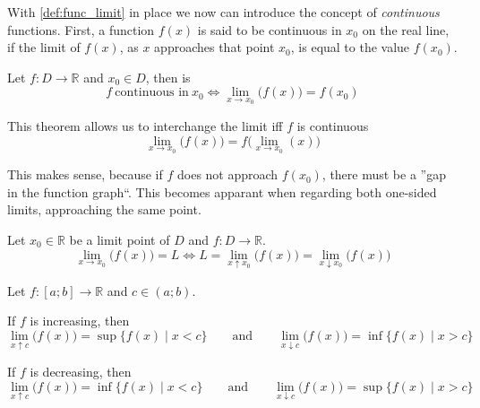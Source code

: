 With \cref{def:func_limit} in place we now can introduce the concept of \emph{continuous} functions.
First, a function \(f(x)\) is said to be continuous in \(x_0\) on the real line, if the limit of \(f(x)\), as \(x\) approaches that point \(x_0\), is equal to the value \(f(x_0)\).
\begin{theorem}
   Let \(f: D \to \mathbb{R}\) and \(x_0 \in D\), then is
   \[f~\text{continuous in}~x_0 \iff \lim_{x \to x_0}\big(f(x)\big) = f(x_0)\]
\end{theorem}
\begin{remark}[Intuition]
   This theorem allows us to interchange the limit iff \(f\) is continuous
   \[\lim_{x \to x_0}\big(f(x)\big) = f\big(\lim_{x \to x_0}(x)\big)\]
\end{remark}
This makes sense, because if \(f\) does not approach \(f(x_0)\), there must be a ''gap in the function graph``.
This becomes apparant when regarding both one-sided limits, approaching the same point.
\begin{theorem}
   Let \(x_0 \in \mathbb{R}\) be a limit point of \(D\) and \(f: D \to \mathbb{R}\).
   \[\lim_{x \to x_0}\big(f(x)\big) = L \iff L = \lim_{x \uparrow x_0}\big(f(x)\big) = \lim_{x \downarrow x_0}\big(f(x)\big)\]
\end{theorem}

\begin{proposition}\label{pro:one_sided_lim_incr}
   Let \(f: [a; b] \to \mathbb{R}\) and \(c \in (a; b)\).

   If \(f\) is increasing, then
   \[\lim_{x \uparrow c}\big(f(x)\big) = \sup\{f(x) \mid x < c\} \qquad\text{and}\qquad \lim_{x \downarrow c}\big(f(x)\big) = \inf\{f(x) \mid x > c\}\]

   If \(f\) is decreasing, then
   \[\lim_{x \uparrow c}\big(f(x)\big) = \inf\{f(x) \mid x < c\} \qquad\text{and}\qquad \lim_{x \downarrow c}\big(f(x)\big) = \sup\{f(x) \mid x > c\}\]
\end{proposition}

